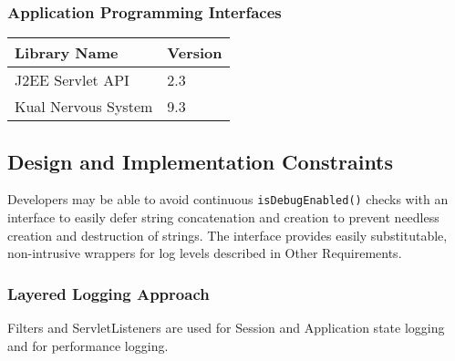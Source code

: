 \documentclass[12pt]{report}
\begin{document}
\subsubsection{Application Programming Interfaces}
\begin{tabular}{l|l}
  Library Name & Version \\
  \hline
  J2EE Servlet API & 2.3 \\
  Kual Nervous System & 9.3 
\end{tabular}

\subsection{Design and Implementation Constraints}
Developers may be able to avoid continuous \verb|isDebugEnabled()| checks with an interface to easily defer string
concatenation and creation to prevent needless creation and destruction of strings. The interface provides easily substitutable,
non-intrusive wrappers for log levels described in Other Requirements.

\subsubsection{Layered Logging Approach}
Filters and ServletListeners are used for Session and Application state logging and for performance logging. 
\end{document}
